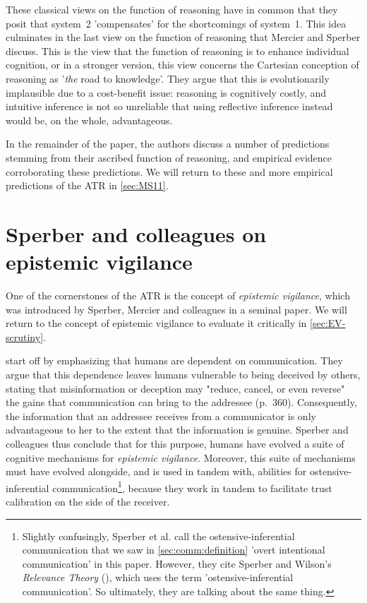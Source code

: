 These classical views on the function of reasoning have in common that they posit that system~2 'compensates' for the shortcomings of system~1.
This idea culminates in the last view on the function of reasoning that Mercier and Sperber discuss. This is the view that the function of reasoning is to enhance individual cognition, or in a stronger version, this view concerns the Cartesian conception of reasoning as '\emph{the} road to knowledge'.
They argue that this is evolutionarily implausible due to a cost-benefit issue:
reasoning is cognitively costly, and intuitive inference is not so unreliable that using reflective inference instead would be, on the whole, advantageous.

In the remainder of the paper, the authors discuss a number of predictions stemming from their ascribed function of reasoning, and empirical evidence corroborating these predictions. We will return to these and more empirical predictions of the ATR in \cref{sec:MS11}.

\section{Sperber and colleagues on epistemic vigilance}
\label{sec:Sperber10}

One of the cornerstones of the ATR is the concept of \emph{epistemic vigilance}, which was introduced by Sperber, Mercier and colleagues in a seminal \citeyear{Sperber10} paper.
We will return to the concept of epistemic vigilance to evaluate it critically in \cref{sec:EV-scrutiny}.

\citet{Sperber10} start off by emphasizing that humans are dependent on communication. They argue that this dependence leaves humans vulnerable to being deceived by others, stating that misinformation or deception may "reduce, cancel, or even reverse" the gains that communication can bring to the addressee (p.~360).
Consequently, the information that an addressee receives from a communicator is only advantageous to her to the extent that the information is genuine.
Sperber and colleagues thus conclude that for this purpose, humans have evolved a suite of cognitive mechanisms for \emph{epistemic vigilance}.
Moreover, this suite of mechanisms must have evolved alongside, and is used in tandem with, abilities for ostensive-inferential communication\footnote{Slightly confusingly, Sperber et al. call the ostensive-inferential communication that we saw in \cref{sec:comm:definition} 'overt intentional communication' in this paper. However, they cite Sperber and Wilson's \emph{Relevance Theory} (\citeyear{SperberWilson86}), which uses the term 'ostensive-inferential communication'. So ultimately, they are talking about the same thing.}, because they work in tandem to facilitate trust calibration on the side of the receiver.

